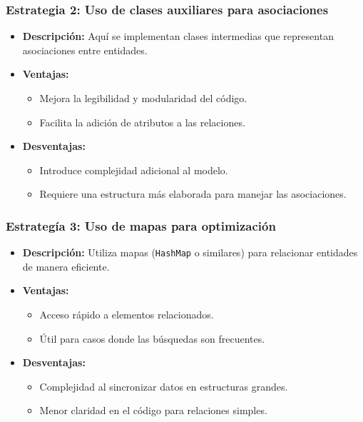 \subsubsection{Estrategia 2: Uso de clases auxiliares para asociaciones}
\begin{itemize}
    \item \textbf{Descripción:} Aquí se implementan clases intermedias que representan asociaciones entre entidades.
    \item \textbf{Ventajas:}
    \begin{itemize}
        \item Mejora la legibilidad y modularidad del código.
        \item Facilita la adición de atributos a las relaciones.
    \end{itemize}
    \item \textbf{Desventajas:}
    \begin{itemize}
        \item Introduce complejidad adicional al modelo.
        \item Requiere una estructura más elaborada para manejar las asociaciones.
    \end{itemize}
\end{itemize}

\subsubsection{Estrategía 3: Uso de mapas para optimización}
\begin{itemize}
    \item \textbf{Descripción:} Utiliza mapas (\texttt{HashMap} o similares) para relacionar entidades de manera eficiente.
    \item \textbf{Ventajas:}
    \begin{itemize}
        \item Acceso rápido a elementos relacionados.
        \item Útil para casos donde las búsquedas son frecuentes.
    \end{itemize}
    \item \textbf{Desventajas:}
    \begin{itemize}
        \item Complejidad al sincronizar datos en estructuras grandes.
        \item Menor claridad en el código para relaciones simples.
    \end{itemize}
\end{itemize}

